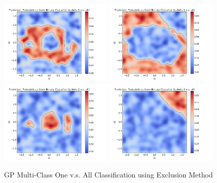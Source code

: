 				\begin{figure}[!htbp]
					\centering
						\includegraphics[width=0.48\textwidth]{Figures/Progress/exclusionOVA/Figure9.png}
						\includegraphics[width=0.48\textwidth]{Figures/Progress/exclusionOVA/Figure10.png}
						\includegraphics[width=0.48\textwidth]{Figures/Progress/exclusionOVA/Figure11.png}
						\includegraphics[width=0.48\textwidth]{Figures/Progress/exclusionOVA/Figure12.png}
					\caption{GP Multi-Class One v.s. All Classification using Exclusion Method}
					\label{ProgressReport:GaussianProcessModels:Figure:exclusionOVA3}
				\end{figure}
				
